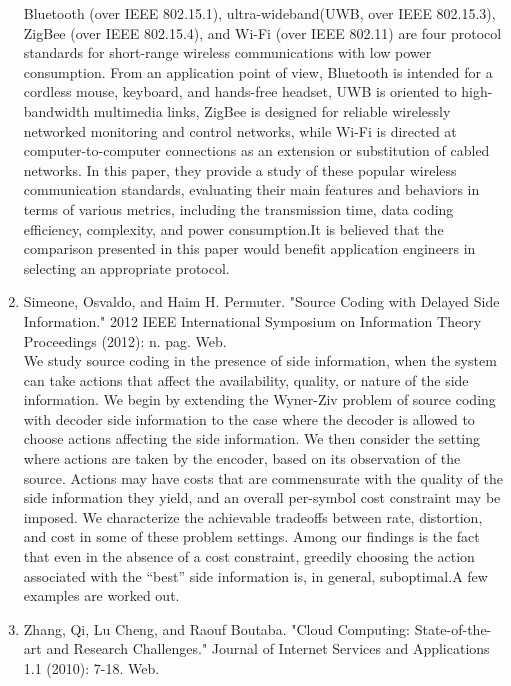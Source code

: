 \documentclass[oneside,a4paper,12pt]{report}
\begin{document}
\begin{enumerate}
Bluetooth (over IEEE 802.15.1), ultra-wideband(UWB, over IEEE 802.15.3), ZigBee (over IEEE 802.15.4), and Wi-Fi (over IEEE 802.11) are four protocol standards for short-range wireless communications with low power consumption. From an application point of view, Bluetooth is intended for a cordless mouse, keyboard, and hands-free headset, UWB is oriented to high-bandwidth multimedia links, ZigBee is designed for reliable wirelessly networked monitoring and control networks, while Wi-Fi is directed at computer-to-computer connections as an extension or substitution of cabled networks. In this paper, they provide a study of these popular wireless communication standards, evaluating their main features and behaviors in terms of various metrics, including the transmission time, data coding efficiency, complexity, and power consumption.It is believed that the comparison presented in this paper would benefit application engineers in selecting an appropriate protocol.\\
\item Simeone, Osvaldo, and Haim H. Permuter. "Source Coding with Delayed Side Information." 2012 IEEE International Symposium on Information Theory Proceedings (2012): n. pag. Web.\\
We study source coding in the presence of side information, when the system can take actions that affect the availability, quality, or nature of the side information. We begin by extending the Wyner-Ziv problem of source coding with decoder side information to the case where the decoder is allowed to choose actions affecting the side information. We then consider the setting where actions are taken by the encoder, based on its observation of the source. Actions may have costs that are commensurate with the quality of the side information they yield, and an overall per-symbol cost constraint may be imposed. We characterize the achievable tradeoffs between rate, distortion, and cost in some of these problem settings. Among our findings is the fact that even in the absence of a cost constraint, greedily choosing the action associated with the “best” side information is, in general, suboptimal.A few examples are worked out.\\
\item Zhang, Qi, Lu Cheng, and Raouf Boutaba. "Cloud Computing: State-of-the-art and Research Challenges." Journal of Internet Services and Applications 1.1 (2010): 7-18. Web.\\

\end{enumerate}
\end{document}
